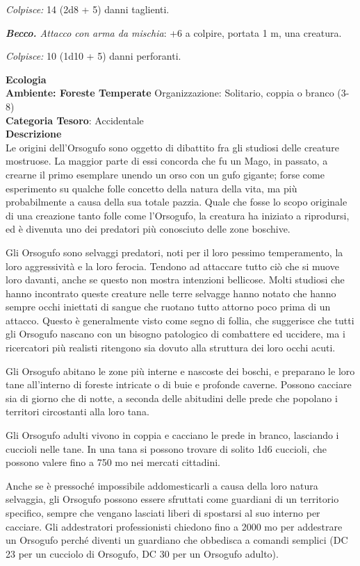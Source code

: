 \begin{multicols}{2}
{\emph{Colpisce:} 14 (2d8 + 5) danni taglienti.

\emph{\textbf{Becco.} Attacco con arma da mischia}: +6 a colpire, portata 1 m, una creatura.

\emph{Colpisce:} 10 (1d10 + 5) danni perforanti.

\textbf{Ecologia}\\
\textbf{Ambiente: Foreste Temperate}
Organizzazione: Solitario, coppia o branco (3-8)\\
\textbf{Categoria Tesoro}: Accidentale\\
\textbf{Descrizione}\\
Le origini dell'Orsogufo sono oggetto di dibattito fra gli studiosi delle creature mostruose. La maggior parte di essi concorda che fu un Mago, in passato, a crearne il primo esemplare unendo un orso con un gufo gigante; forse come esperimento su qualche folle concetto della natura della vita, ma più probabilmente a causa della sua totale pazzia. Quale che fosse lo scopo originale di una creazione tanto folle come l'Orsogufo, la creatura ha iniziato a riprodursi, ed è divenuta uno dei predatori più conosciuto delle zone boschive.

Gli Orsogufo sono selvaggi predatori, noti per il loro pessimo temperamento, la loro aggressività e la loro ferocia. Tendono ad attaccare tutto ciò che si muove loro davanti, anche se questo non mostra intenzioni bellicose. Molti studiosi che hanno incontrato queste creature nelle terre selvagge hanno notato che hanno sempre occhi iniettati di sangue che ruotano tutto attorno poco prima di un attacco. Questo è generalmente visto come segno di follia, che suggerisce che tutti gli Orsogufo nascano con un bisogno patologico di combattere ed uccidere, ma i ricercatori più realisti ritengono sia dovuto alla struttura dei loro occhi acuti.

Gli Orsogufo abitano le zone più interne e nascoste dei boschi, e preparano le loro tane all'interno di foreste intricate o di buie e profonde caverne. Possono cacciare sia di giorno che di notte, a seconda delle abitudini delle prede che popolano i territori circostanti alla loro tana.

Gli Orsogufo adulti vivono in coppia e cacciano le prede in branco, lasciando i cuccioli nelle tane. In una tana si possono trovare di solito 1d6 cuccioli, che possono valere fino a 750 mo nei mercati cittadini.

Anche se è pressoché impossibile addomesticarli a causa della loro natura selvaggia, gli Orsogufo possono essere sfruttati come guardiani di un territorio specifico, sempre che vengano lasciati liberi di spostarsi al suo interno per cacciare. Gli addestratori professionisti chiedono fino a 2000 mo per addestrare un Orsogufo perché diventi un guardiano che obbedisca a comandi semplici (DC 23 per un cucciolo di Orsogufo, DC 30 per un Orsogufo adulto).

}
\end{multicols}
